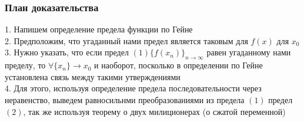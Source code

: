\documentclass{article}
\begin{document}
\subsubsection{План доказательства}
1. Напишем определение предела функции по Гейне \\
2. Предположим, что угаданный нами предел является таковым для $f(x)$ для $x_0$ \\
3. Нужно указать, что если предел $(1) \{f(x_n)\}_{n \to \infty}$ равен угаданному нами пределу, то $\forall \{x_n\} \to x_0$ и наоборот, посколько в определении по Гейне установлена связь между такими утверждениями \\
4. Для этого, используя определение предела последовательности через неравенство, выведем равносильнми преобразованиями из предела $(1)$ предел $(2)$, так же используя теорему о двух милиционерах (о сжатой переменной)
\end{document}
